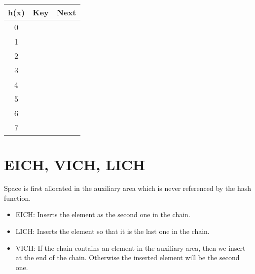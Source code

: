 \begin{tabular}{|c|c|c|}
\hline
h(x) & Key & Next \\ \hline\hline
0 & \hspace{3cm} & \hspace{1cm} \\ \hline
1 & \hspace{3cm} & \hspace{1cm} \\ \hline
2 & \hspace{3cm} & \hspace{1cm} \\ \hline
3 & \hspace{3cm} & \hspace{1cm} \\ \hline
4 & \hspace{3cm} & \hspace{1cm} \\ \hline
5 & \hspace{3cm} & \hspace{1cm} \\ \hline
6 & \hspace{3cm} & \hspace{1cm} \\ \hline
7 & \hspace{3cm} & \hspace{1cm} \\ \hline
\end{tabular}

\section*{EICH, VICH, LICH}
Space is first allocated in the auxiliary area which is never referenced by the hash function.
\begin{itemize}
\item EICH: Inserts the element as the second one in the chain.
\item LICH: Inserts the element so that it is the last one in the chain.
\item VICH: If the chain contains an element in the auxiliary area, then we insert at the end of the chain. Otherwise the inserted element will be the second one.
\end{itemize}

